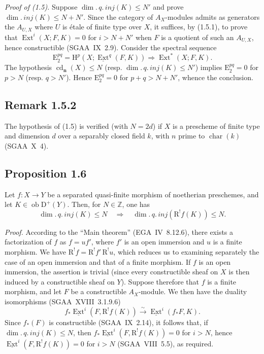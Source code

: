 \documentclass[11pt]{article}
\renewcommand{\H}{\mathrm{H}}
\DeclareMathOperator{\Ext}{Ext}
\DeclareMathOperator{\cd}{cd}
\newcommand{\R}{\mathrm{R}}
\newcommand{\D}{\mathrm{D}}
\newcommand{\Z}{\mathbb{Z}}
\newcommand{\E}{\mathrm{E}}
\newcommand{\ob}{\operatorname{ob}}
\newcommand{\charac}{\operatorname{char}}
\providecommand{\ob}{\operatorname{ob}}
\providecommand{\R}{\mathrm R}
\providecommand{\Z}{\mathbb Z}
\begin{document}
\emph{Proof of (1.5).} Suppose $\dim.\,q.\,inj(K) \leqslant N'$ and prove $\dim.\,inj(K) \leqslant N + N'$. Since the category of $A_X$-modules admits as generators the $A_{U,X}$ where $U$ is étale of finite type over $X$, it suffices, by (1.5.1), to prove that $\Ext^i(X; F,K) = 0$ for $i > N + N'$ when $F$ is a quotient of such an $A_{U,X}$, hence constructible (SGAA~IX~2.9). Consider the spectral sequence
\[
\E_2^{pq} = \H^p(X; \underline{\Ext}^q(F,K)) \Rightarrow \Ext^{*}(X; F,K).
\]
The hypothesis $\cd_{\mathbf{n}}(X) \leqslant N$ (resp. $\dim.\,q.\,inj(K) \leqslant N'$) implies $\E_2^{pq} = 0$ for $p > N$ (resp. $q > N'$). Hence $\E_2^{pq} = 0$ for $p+q > N+N'$, whence the conclusion.

\subsection*{Remark 1.5.2}
The hypothesis of (1.5) is verified (with $N = 2d$) if $X$ is a prescheme of finite type and dimension $d$ over a separably closed field $k$, with $n$ prime to $\charac(k)$ (SGAA~X~4).

\subsection*{Proposition 1.6}
Let $f : X \to Y$ be a separated quasi-finite morphism of noetherian preschemes, and let $K \in \ob \D^{+}(Y)$. Then, for $N \in \Z$, one has
\[
\dim.\,q.\,inj(K) \leqslant N \quad \Longrightarrow \quad \dim.\,q.\,inj(\R^{!}f(K)) \leqslant N.
\]

\emph{Proof.} According to the ``Main theorem'' (EGA~IV~8.12.6), there exists a factorization of $f$ as $f = uf'$, where $f'$ is an open immersion and $u$ is a finite morphism. We have $\R^{!}f = \R^{!}f' \, \R^{!}u$, which reduces us to examining separately the case of an open immersion and that of a finite morphism. If $f$ is an open immersion, the assertion is trivial (since every constructible sheaf on $X$ is then induced by a constructible sheaf on $Y$). Suppose therefore that $f$ is a finite morphism, and let $F$ be a constructible $A_X$-module. We then have the duality isomorphisms (SGAA~XVIII~3.1.9.6)
\[
f_{*}\underline{\Ext}^i(F, \R^{!}f(K)) \xrightarrow{\sim} \underline{\Ext}^i(f_{*}F, K).
\]
Since $f_{*}(F)$ is constructible (SGAA~IX~2.14), it follows that, if $\dim.\,q.\,inj(K) \leqslant N$, then $f_{*}\underline{\Ext}^i(F, \R^{!}f(K)) = 0$ for $i > N$, hence $\underline{\Ext}^i(F, \R^{!}f(K)) = 0$ for $i > N$ (SGAA~VIII~5.5), as required.
\end{document}

